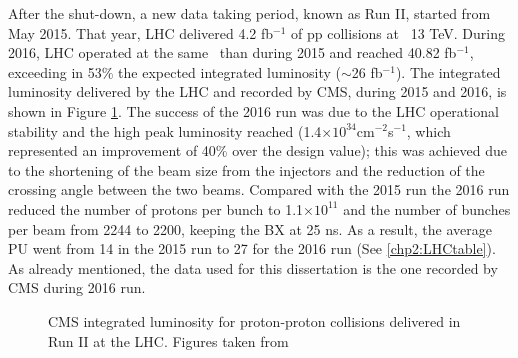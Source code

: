 After the shut-down, a new data taking period, known as Run II, started from May 
2015. That year, LHC delivered 4.2 fb$^{-1}$ of pp collisions at \sqrts~13 TeV. During 2016, LHC 
operated at the same \centermassenergy~than during 2015 and reached 40.82 fb$^{-1}$, exceeding  in 53$\%$ the expected integrated 
luminosity ($\sim$26 fb$^{-1}$). The integrated luminosity delivered by the LHC and recorded by CMS, 
during 2015 and 2016, is shown in Figure \ref{figchp2:luminosityRunII}. The success of the 2016 run was due to
the LHC operational stability and the high peak luminosity reached (1.4$\times10^{34}$cm$^{-2}$s$^{-1}$, which represented 
an improvement of 40$\%$ over the design value); this was achieved due to 
the shortening of the beam size from the injectors and the reduction of the 
crossing angle between the two beams. Compared with the 2015 run the 2016 run 
reduced the number of protons per bunch to 1.1$\times10^{11}$ and the number of bunches per beam 
from 2244 to 2200, keeping the BX at 25 ns. As a result, the average
PU went from 14 in the 2015 run to 27 for the 2016 run (See \ref{chp2:LHCtable}). As already mentioned, 
the data used for this dissertation is the one recorded by CMS during 2016 run.
\begin{figure}[ht]
    \begin{center}
      \caption{CMS integrated luminosity for proton-proton collisions delivered
      in Run II at the LHC. Figures taken from \cite{chp2:LHCluminosity}}
     \label{figchp2:luminosityRunII}
    \end{center}
\end{figure}

